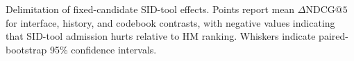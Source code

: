 \caption{
Delimitation of fixed-candidate SID-tool effects. Points report mean
$\Delta\mathrm{NDCG}@5$ for interface, history, and codebook contrasts, with
negative values indicating that SID-tool admission hurts relative to HM ranking.
Whiskers indicate paired-bootstrap 95\% confidence intervals.
}
\label{fig:delimitation}
